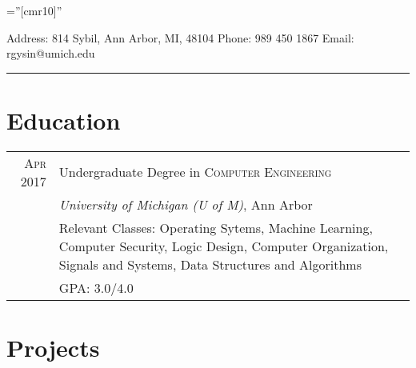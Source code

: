 \documentclass[a4paper,10pt]{article} %
\begin{document}
\pagestyle{empty} %

\font\fb=''[cmr10]'' %


\par{\bigskip\par} %

Address: 814 Sybil, Ann Arbor, MI, 48104 \hfill Phone: 989 450 1867
\hfill Email: rgysin@umich.edu \\
\rule{\textwidth}{1pt}


\section{Education}

\begin{tabular}{r|p{12cm}}
\textsc{Apr} 2017 \space\space & Undergraduate Degree in \textsc{Computer Engineering} \\
& \normalsize\emph{University of Michigan (U of M)}, Ann Arbor \\
& \footnotesize{Relevant Classes: Operating Sytems, Machine Learning,
  Computer Security, Logic Design, Computer Organization, Signals and Systems,
  Data Structures and Algorithms} \\
& \footnotesize{GPA: 3.0/4.0} \\
\end{tabular}


\section{Projects}
\end{document}
